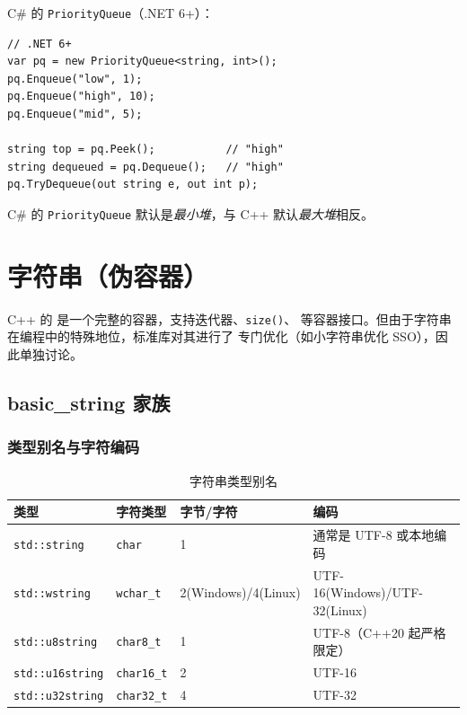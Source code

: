 \documentclass[12pt,a4paper,fontset=fandol]{ctexbook}
\newcommand{\cpp}[1]{C++#1}
\newcommand{\Fn}[1]{\texttt{#1()}}
\newcommand{\Tp}[1]{\texttt{#1}}
\begin{document}
\begin{compare}
C\# 的 \texttt{PriorityQueue}（.NET 6+）：
\begin{lstlisting}[style=csharpstyle]
// .NET 6+
var pq = new PriorityQueue<string, int>();
pq.Enqueue("low", 1);
pq.Enqueue("high", 10);
pq.Enqueue("mid", 5);

string top = pq.Peek();           // "high"
string dequeued = pq.Dequeue();   // "high"
pq.TryDequeue(out string e, out int p);
\end{lstlisting}
C\# 的 \texttt{PriorityQueue} 默认是\emph{最小堆}，与 C++ 默认\emph{最大堆}相反。
\end{compare}

\part{字符串（伪容器）}

C++ 的 \Tp{} 是一个完整的容器，支持迭代器、\Fn{size}、
\Tp{} 等容器接口。但由于字符串在编程中的特殊地位，标准库对其进行了
专门优化（如小字符串优化 SSO），因此单独讨论。

\chapter{basic\_string 家族}

\section{类型别名与字符编码}

\begin{table}[htbp]
\centering
\caption{字符串类型别名}
\begin{tabularx}{\textwidth}{l l l >{\raggedright\arraybackslash}X}
\toprule
\textbf{类型} & \textbf{字符类型} & \textbf{字节/字符} & \textbf{编码} \\
\midrule
\Tp{std::string}     & \texttt{char}     & 1 & 通常是 UTF-8 或本地编码 \\
\Tp{std::wstring}    & \texttt{wchar\_t} & 2(Windows)/4(Linux) & UTF-16(Windows)/UTF-32(Linux) \\
\Tp{std::u8string}   & \texttt{char8\_t} & 1 & UTF-8（\cpp{20} 起严格限定） \\
\Tp{std::u16string}  & \texttt{char16\_t}& 2 & UTF-16 \\
\Tp{std::u32string}  & \texttt{char32\_t}& 4 & UTF-32 \\
\bottomrule
\end{tabularx}
\end{table}
\end{document}
